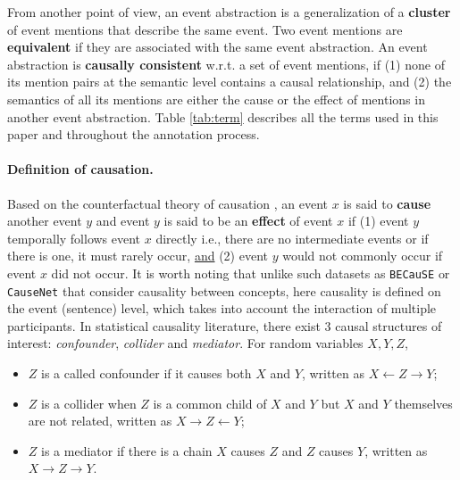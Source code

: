 From another point of view, an event abstraction is a generalization of a \textbf{cluster} of event mentions that describe the same event. Two event mentions are \textbf{equivalent} if they are associated with the same event abstraction. An event abstraction is \textbf{causally consistent} w.r.t. a set of event mentions, if (1) none of its mention pairs at the semantic level contains a causal relationship, and (2) the semantics of all its mentions are either the cause or the effect of mentions in another event abstraction. Table \ref{tab:term} describes all the terms used in this paper and throughout the annotation process.

\paragraph{Definition of causation.} Based on the counterfactual theory of causation \citep{lewis2013counterfactuals}, an event $x$ is said to \textbf{cause} another event $y$ and event $y$ is said to be an \textbf{effect} of event $x$ if (1) event $y$ temporally follows event $x$ directly i.e., there are no intermediate events or if there is one, it must rarely occur, \underline{and} (2) event $y$ would not commonly occur if event $x$ did not occur. It is worth noting that unlike such datasets as \texttt{BECauSE} \citep{dunietz2017because} or \texttt{CauseNet} \citep{heindorf2020causenet} that consider causality between concepts, here causality is defined on the event (sentence) level, which takes into account the interaction of multiple participants. In statistical causality literature,  there exist $3$ causal structures of interest: \textit{confounder}, \textit{collider} and \textit{mediator}. For random variables $X, Y, Z$,

\begin{itemize}
    \item $Z$ is a called confounder if it causes both $X$ and $Y$, written as $X \leftarrow Z \rightarrow Y$;
    \item $Z$ is a collider when $Z$ is a common child of $X$ and $Y$ but $X$ and $Y$ themselves are not related, written as $X \rightarrow Z \leftarrow Y$;
    \item $Z$ is a mediator if there is a chain $X$ causes $Z$ and $Z$ causes $Y$, written as  $X \rightarrow Z \rightarrow Y$.
\end{itemize}


